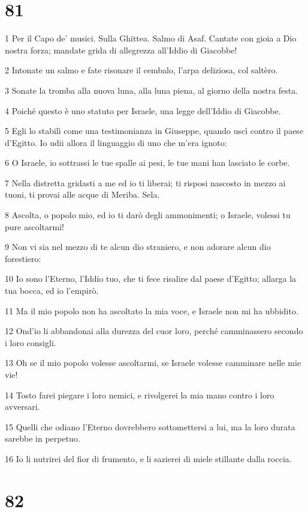 \chapter{81}

\par 1 Per il Capo de' musici. Sulla Ghittea. Salmo di Asaf. Cantate con gioia a Dio nostra forza; mandate grida di allegrezza all'Iddio di Giacobbe!
\par 2 Intonate un salmo e fate risonare il cembalo, l'arpa deliziosa, col saltèro.
\par 3 Sonate la tromba alla nuova luna, alla luna piena, al giorno della nostra festa.
\par 4 Poiché questo è uno statuto per Israele, una legge dell'Iddio di Giacobbe.
\par 5 Egli lo stabilì come una testimonianza in Giuseppe, quando uscì contro il paese d'Egitto. Io udii allora il linguaggio di uno che m'era ignoto:
\par 6 O Israele, io sottrassi le tue spalle ai pesi, le tue mani han lasciato le corbe.
\par 7 Nella distretta gridasti a me ed io ti liberai; ti risposi nascosto in mezzo ai tuoni, ti provai alle acque di Meriba. Sela.
\par 8 Ascolta, o popolo mio, ed io ti darò degli ammonimenti; o Israele, volessi tu pure ascoltarmi!
\par 9 Non vi sia nel mezzo di te alcun dio straniero, e non adorare alcun dio forestiero:
\par 10 Io sono l'Eterno, l'Iddio tuo, che ti fece risalire dal paese d'Egitto; allarga la tua bocca, ed io l'empirò.
\par 11 Ma il mio popolo non ha ascoltato la mia voce, e Israele non mi ha ubbidito.
\par 12 Ond'io li abbandonai alla durezza del cuor loro, perché camminassero secondo i loro consigli.
\par 13 Oh se il mio popolo volesse ascoltarmi, se Israele volesse camminare nelle mie vie!
\par 14 Tosto farei piegare i loro nemici, e rivolgerei la mia mano contro i loro avversari.
\par 15 Quelli che odiano l'Eterno dovrebbero sottomettersi a lui, ma la loro durata sarebbe in perpetuo.
\par 16 Io li nutrirei del fior di frumento, e li sazierei di miele stillante dalla roccia.

\chapter{82}

